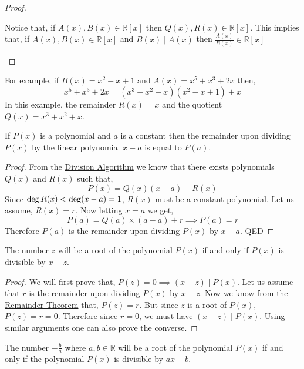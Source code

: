 \begin{proof}
    \begin{remark}
        Notice that, if $A(x), B(x) \in \mathbb{R}[x]$ then $Q(x), R(x) \in \mathbb{R}[x]$. This implies that, 
        if $A(x), B(x) \in \mathbb{R}[x]$ and $B(x)\mid A(x)$ then $\frac{A(x)}{B(x)} \in \mathbb{R}[x]$
    \end{remark}
\end{proof}

For example, if $B(x)= x^{2}-x+1$ and $A(x)=x^{5}+x^{3}+2x$ then,
\[
    x^{5}+x^{3}+2x = \left(x^{3}+x^{2}+x\right) \left(x^{2}-x+1\right) +x
\]
In this example, the remainder $R(x)=x$ and the quotient $Q(x)=x^{3}+x^{2}+x$. \\

\begin{theorem}\label{thm:remainder-theorem}
    If $P(x)$ is a polynomial and $a$ is a constant then the remainder upon dividing $P(x)$ by the linear 
    polynomial $x-a$ is equal to $P(a)$.
\end{theorem}
\begin{proof}
    From the \hyperref[thm:division-algorithm]{Division Algorithm} we know that there exists polynomials $Q(x)$ and $R(x)$ 
    such that,
    \[
        P(x) = Q(x)\left(x-a\right) + R(x)
    \]
    Since $\operatorname{deg} R(x) < \operatorname{deg} (x-a)=1$, $R(x)$ must be a constant polynomial. Let us assume, $R(x)=r$. 
    Now letting $x=a$ we get,
    \[
        P(a) = Q(a)\times (a-a) + r \implies P(a) = r
    \]
    Therefore $P(a)$ is the remainder upon dividing $P(x)$ by $x-a$. \textsf{QED}
\end{proof}

\begin{theorem}\label{thm:factor-theorem}
    The number $z$ will be a root of the polynomial $P(x)$ if and only if $P(x)$ is divisible by $x-z$.
\end{theorem}
\begin{proof}
    We will first prove that, $P(z)=0 \implies (x-z) \mid P(x)$. 
    Let us assume that $r$ is the remainder upon dividing $P(x)$ by $x-z$. 
    Now we know from the \hyperref[thm:remainder-theorem]{Remainder Theorem} that, $P(z)=r$. 
    But since $z$ is a root of $P(x)$, $P(z)=r=0$. Therefore since $r=0$, we must have $(x-z)\mid P(x)$. 
    Using similar arguments one can also prove the converse. 
\end{proof}
\begin{corollary}
    The number $-\frac{b}{a}$ where $a, b\in \mathbb{R}$ will be a root of the polynomial $P(x)$ if and only if the 
    polynomial $P(x)$ is divisible by $ax+b$.
\end{corollary}

